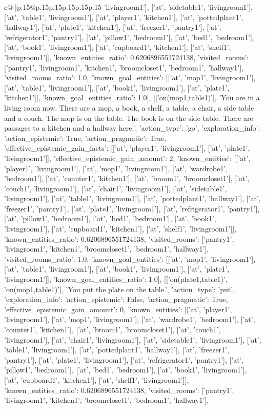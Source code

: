 \documentclass{article}
\begin{document}
{\begin{supertabular}{c@{$\;$}|p{.15\linewidth}@{}p{.15\linewidth}p{.15\linewidth}p{.15\linewidth}p{.15\linewidth}p{.15\linewidth}}
{{{'livingroom1'], ['at', 'sidetable1', 'livingroom1'], ['at', 'table1', 'livingroom1'], ['at', 'player1', 'kitchen1'], ['at', 'pottedplant1', 'hallway1'], ['at', 'plate1', 'kitchen1'], ['at', 'freezer1', 'pantry1'], ['at', 'refrigerator1', 'pantry1'], ['at', 'pillow1', 'bedroom1'], ['at', 'bed1', 'bedroom1'], ['at', 'book1', 'livingroom1'], ['at', 'cupboard1', 'kitchen1'], ['at', 'shelf1', 'livingroom1']], 'known_entities_ratio': 0.6206896551724138, 'visited_rooms': ['pantry1', 'livingroom1', 'kitchen1', 'broomcloset1', 'bedroom1', 'hallway1'], 'visited_rooms_ratio': 1.0, 'known_goal_entities': [['at', 'mop1', 'livingroom1'], ['at', 'table1', 'livingroom1'], ['at', 'book1', 'livingroom1'], ['at', 'plate1', 'kitchen1']], 'known_goal_entities_ratio': 1.0}}], [['on(mop1,table1)'], 'You are in a living room now. There are a mop, a book, a shelf, a table, a chair, a side table and a couch. The mop is on the table. The book is on the side table. There are passages to a kitchen and a hallway here.', {'action_type': 'go', 'exploration_info': {'action_epistemic': True, 'action_pragmatic': True, 'effective_epistemic_gain_facts': [['at', 'player1', 'livingroom1'], ['at', 'plate1', 'livingroom1']], 'effective_epistemic_gain_amount': 2, 'known_entities': [['at', 'player1', 'livingroom1'], ['at', 'mop1', 'livingroom1'], ['at', 'wardrobe1', 'bedroom1'], ['at', 'counter1', 'kitchen1'], ['at', 'broom1', 'broomcloset1'], ['at', 'couch1', 'livingroom1'], ['at', 'chair1', 'livingroom1'], ['at', 'sidetable1', 'livingroom1'], ['at', 'table1', 'livingroom1'], ['at', 'pottedplant1', 'hallway1'], ['at', 'freezer1', 'pantry1'], ['at', 'plate1', 'livingroom1'], ['at', 'refrigerator1', 'pantry1'], ['at', 'pillow1', 'bedroom1'], ['at', 'bed1', 'bedroom1'], ['at', 'book1', 'livingroom1'], ['at', 'cupboard1', 'kitchen1'], ['at', 'shelf1', 'livingroom1']], 'known_entities_ratio': 0.6206896551724138, 'visited_rooms': ['pantry1', 'livingroom1', 'kitchen1', 'broomcloset1', 'bedroom1', 'hallway1'], 'visited_rooms_ratio': 1.0, 'known_goal_entities': [['at', 'mop1', 'livingroom1'], ['at', 'table1', 'livingroom1'], ['at', 'book1', 'livingroom1'], ['at', 'plate1', 'livingroom1']], 'known_goal_entities_ratio': 1.0}}], [['on(plate1,table1)', 'on(mop1,table1)'], 'You put the plate on the table.', {'action_type': 'put', 'exploration_info': {'action_epistemic': False, 'action_pragmatic': True, 'effective_epistemic_gain_amount': 0, 'known_entities': [['at', 'player1', 'livingroom1'], ['at', 'mop1', 'livingroom1'], ['at', 'wardrobe1', 'bedroom1'], ['at', 'counter1', 'kitchen1'], ['at', 'broom1', 'broomcloset1'], ['at', 'couch1', 'livingroom1'], ['at', 'chair1', 'livingroom1'], ['at', 'sidetable1', 'livingroom1'], ['at', 'table1', 'livingroom1'], ['at', 'pottedplant1', 'hallway1'], ['at', 'freezer1', 'pantry1'], ['at', 'plate1', 'livingroom1'], ['at', 'refrigerator1', 'pantry1'], ['at', 'pillow1', 'bedroom1'], ['at', 'bed1', 'bedroom1'], ['at', 'book1', 'livingroom1'], ['at', 'cupboard1', 'kitchen1'], ['at', 'shelf1', 'livingroom1']], 'known_entities_ratio': 0.6206896551724138, 'visited_rooms': ['pantry1', 'livingroom1', 'kitchen1', 'broomcloset1', 'bedroom1', 'hallway1'], }}}
\end{supertabular}}
\end{document}
